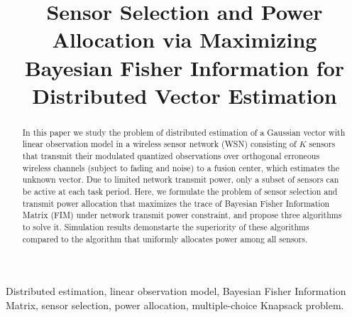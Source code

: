 \documentclass[conference]{IEEEtran}
\begin{document}
\title{Sensor Selection and Power Allocation via Maximizing Bayesian Fisher Information for Distributed Vector Estimation}

\author{
}
\maketitle
\begin{abstract}
In this paper we study the problem of distributed estimation of a Gaussian vector with linear observation model in a wireless sensor network (WSN) consisting of $K$ sensors that transmit their modulated quantized observations over orthogonal erroneous wireless channels (subject to fading and noise) to a fusion center, which estimates the unknown vector. Due to limited network transmit power, only a subset of sensors can be active at each task period. Here, we formulate the problem of sensor selection and transmit power allocation that maximizes the trace of Bayesian Fisher Information Matrix (FIM) under network transmit power constraint, and propose three algorithms to solve it. Simulation results demonstarte the superiority of these algorithms compared to the algorithm that uniformly allocates power among all sensors.
\end{abstract}
\begin{IEEEkeywords}
Distributed estimation, linear observation model, Bayesian Fisher Information Matrix, sensor selection, power allocation, multiple-choice Knapsack problem.
\end{IEEEkeywords}
%
\IEEEpeerreviewmaketitle
\end{document}
